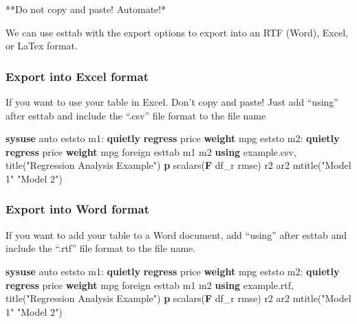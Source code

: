 \documentclass[
]{book}
\newenvironment{Shaded}{\begin{snugshade}}{\end{snugshade}}
\newcommand{\BaseNTok}[1]{\textcolor[rgb]{0.00,0.00,0.81}{#1}}
\newcommand{\FunctionTok}[1]{\textcolor[rgb]{0.13,0.29,0.53}{\textbf{#1}}}
\newcommand{\KeywordTok}[1]{\textcolor[rgb]{0.13,0.29,0.53}{\textbf{#1}}}
\newcommand{\NormalTok}[1]{#1}
\newcommand{\StringTok}[1]{\textcolor[rgb]{0.31,0.60,0.02}{#1}}
\begin{document}
**Do not copy and paste! Automate!*

We can use esttab with the export options to export into an RTF (Word), Excel, or LaTex format.

\subsubsection{Export into Excel format}\label{export-into-excel-format}

If you want to use your table in Excel. Don't copy and paste! Just add ``using'' after esttab and include the ``.csv'' file format to the file name

\begin{Shaded}
\begin{Highlighting}[]
\KeywordTok{sysuse}\NormalTok{ auto}
\NormalTok{eststo m1: }\KeywordTok{quietly} \KeywordTok{regress}\NormalTok{ price }\KeywordTok{weight}\NormalTok{ mpg}
\NormalTok{eststo m2: }\KeywordTok{quietly} \KeywordTok{regress}\NormalTok{ price }\KeywordTok{weight}\NormalTok{ mpg foreign}
\NormalTok{esttab m1 m2 }\KeywordTok{using}\NormalTok{ example.csv, }\BaseNTok{title}\NormalTok{(}\StringTok{"Regression Analysis Example"}\NormalTok{) }\KeywordTok{p}\NormalTok{ scalars(}\FunctionTok{F}\NormalTok{ df\_r rmse) r2 ar2 mtitle(}\StringTok{"Model 1"} \StringTok{"Model 2"}\NormalTok{)}
\end{Highlighting}
\end{Shaded}

\subsubsection{Export into Word format}\label{export-into-word-format}

If you want to add your table to a Word document, add ``using'' after esttab and include the ``.rtf'' file format to the file name.

\begin{Shaded}
\begin{Highlighting}[]
\KeywordTok{sysuse}\NormalTok{ auto}
\NormalTok{eststo m1: }\KeywordTok{quietly} \KeywordTok{regress}\NormalTok{ price }\KeywordTok{weight}\NormalTok{ mpg}
\NormalTok{eststo m2: }\KeywordTok{quietly} \KeywordTok{regress}\NormalTok{ price }\KeywordTok{weight}\NormalTok{ mpg foreign}
\NormalTok{esttab m1 m2 }\KeywordTok{using}\NormalTok{ example.rtf, }\BaseNTok{title}\NormalTok{(}\StringTok{"Regression Analysis Example"}\NormalTok{) }\KeywordTok{p}\NormalTok{ scalars(}\FunctionTok{F}\NormalTok{ df\_r rmse) r2 ar2 mtitle(}\StringTok{"Model 1"} \StringTok{"Model 2"}\NormalTok{)}
\end{Highlighting}
\end{Shaded}
\end{document}
